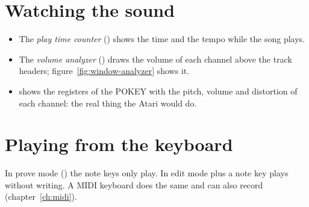 \section{Watching the sound}

\begin{itemize}
  \item The \emph{play time counter} () shows the time and the tempo while the song plays.
  \item The \emph{volume analyzer} () draws the volume of each channel above the track
        headers; figure~\ref{fig:window-analyzer} shows it.
  \item {} shows the registers of the POKEY with the pitch, volume and distortion
        of each channel: the real thing the Atari would do.
\end{itemize}


\section{Playing from the keyboard}

In prove mode () the note keys only play. In edit mode  plus a note key plays without writing. A
MIDI keyboard does the same and can also record (chapter~\ref{ch:midi}).
